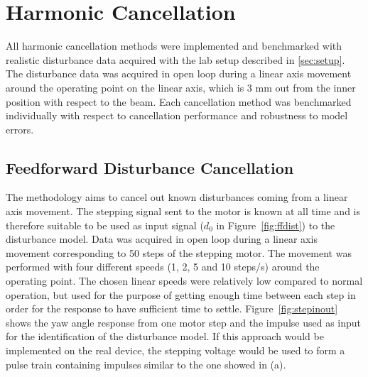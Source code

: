 \newpage
\FloatBarrier
\section{Harmonic Cancellation}
All harmonic cancellation methods were implemented and benchmarked with realistic disturbance data acquired with the lab setup described in \ref{sec:setup}. The disturbance data was acquired in open loop during a linear axis movement around the operating point on the linear axis, which is 3 mm out from the inner position with respect to the beam. Each cancellation method was benchmarked individually with respect to cancellation performance and robustness to model errors.

\subsection{Feedforward Disturbance Cancellation}\label{sec:hc}
The \abbrFDC methodology aims to cancel out known disturbances coming from a linear axis movement. The stepping signal sent to the motor is known at all time and is therefore suitable to be used as input signal ($d_0$ in Figure~\ref{fig:ffdist}) to the disturbance model. Data was acquired in open loop during a linear axis movement corresponding to 50 steps of the stepping motor. The movement was performed with four different speeds (1, 2, 5 and 10 steps/s) around the operating point. The chosen linear speeds were relatively low compared to normal operation, but used for the purpose of getting enough time between each step in order for the response to have sufficient time to settle. Figure~\ref{fig:stepinout} shows the yaw angle response from one motor step and the impulse used as input for the identification of the disturbance model. If this approach would be implemented on the real device, the stepping voltage would be used to form a pulse train containing impulses similar to the one showed in (a).

